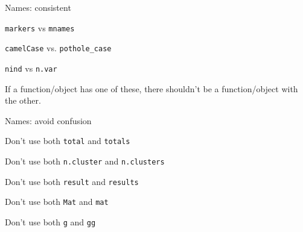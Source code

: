 \documentclass[12pt,t]{beamer}
\begin{document}
\begin{frame}{Names: consistent}

\bbi
\item {\tt markers} vs {\tt mnames}

\item {\tt camelCase} vs. {\tt pothole\_case}

\item {\tt nind} vs {\tt n.var}

\item If a function/object has one of these, there shouldn't be a
  function/object with the other.

\ei

\end{frame}



\begin{frame}{Names: avoid confusion}

\bbi
\item Don't use both {\tt total} and {\tt totals}
\item Don't use both {\tt n.cluster} and {\tt n.clusters}
\item Don't use both {\tt result} and {\tt results}
\item Don't use both {\tt Mat} and {\tt mat}
\item Don't use both {\tt g} and {\tt gg}
\ei

\end{frame}
\end{document}

